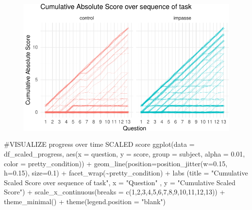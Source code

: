 \documentclass[
  letterpaper,
  DIV=11,
  numbers=noendperiod]{scrreprt}
\newenvironment{Shaded}{\begin{snugshade}}{\end{snugshade}}
\newcommand{\AttributeTok}[1]{\textcolor[rgb]{0.40,0.45,0.13}{#1}}
\newcommand{\CommentTok}[1]{\textcolor[rgb]{0.37,0.37,0.37}{#1}}
\newcommand{\DecValTok}[1]{\textcolor[rgb]{0.68,0.00,0.00}{#1}}
\newcommand{\FloatTok}[1]{\textcolor[rgb]{0.68,0.00,0.00}{#1}}
\newcommand{\FunctionTok}[1]{\textcolor[rgb]{0.28,0.35,0.67}{#1}}
\newcommand{\NormalTok}[1]{\textcolor[rgb]{0.00,0.23,0.31}{#1}}
\newcommand{\SpecialCharTok}[1]{\textcolor[rgb]{0.37,0.37,0.37}{#1}}
\newcommand{\StringTok}[1]{\textcolor[rgb]{0.13,0.47,0.30}{#1}}
\begin{document}
\begin{figure}[H]

{\centering \includegraphics{analysis/SGC3A/2_sgc3A_scoring_files/figure-pdf/VIZ-PROGRESS-1.pdf}

}

\end{figure}

\begin{Shaded}
\begin{Highlighting}[]
\CommentTok{\#VISUALIZE progress over time SCALED score }
\FunctionTok{ggplot}\NormalTok{(}\AttributeTok{data =}\NormalTok{ df\_scaled\_progress, }\FunctionTok{aes}\NormalTok{(}\AttributeTok{x =}\NormalTok{ question, }\AttributeTok{y =}\NormalTok{ score, }\AttributeTok{group =}\NormalTok{ subject, }\AttributeTok{alpha =} \FloatTok{0.01}\NormalTok{, }\AttributeTok{color =}\NormalTok{ pretty\_condition)) }\SpecialCharTok{+} 
 \FunctionTok{geom\_line}\NormalTok{(}\AttributeTok{position=}\FunctionTok{position\_jitter}\NormalTok{(}\AttributeTok{w=}\FloatTok{0.15}\NormalTok{, }\AttributeTok{h=}\FloatTok{0.15}\NormalTok{), }\AttributeTok{size=}\FloatTok{0.1}\NormalTok{) }\SpecialCharTok{+}
 \FunctionTok{facet\_wrap}\NormalTok{(}\SpecialCharTok{\textasciitilde{}}\NormalTok{pretty\_condition) }\SpecialCharTok{+} 
 \FunctionTok{labs}\NormalTok{ (}\AttributeTok{title =} \StringTok{"Cumulative Scaled Score over sequence of task"}\NormalTok{, }\AttributeTok{x =} \StringTok{"Question"}\NormalTok{ , }\AttributeTok{y =} \StringTok{"Cumulative Scaled Score"}\NormalTok{) }\SpecialCharTok{+} 
 \FunctionTok{scale\_x\_continuous}\NormalTok{(}\AttributeTok{breaks =} \FunctionTok{c}\NormalTok{(}\DecValTok{1}\NormalTok{,}\DecValTok{2}\NormalTok{,}\DecValTok{3}\NormalTok{,}\DecValTok{4}\NormalTok{,}\DecValTok{5}\NormalTok{,}\DecValTok{6}\NormalTok{,}\DecValTok{7}\NormalTok{,}\DecValTok{8}\NormalTok{,}\DecValTok{9}\NormalTok{,}\DecValTok{10}\NormalTok{,}\DecValTok{11}\NormalTok{,}\DecValTok{12}\NormalTok{,}\DecValTok{13}\NormalTok{)) }\SpecialCharTok{+}
 \FunctionTok{theme\_minimal}\NormalTok{() }\SpecialCharTok{+} \FunctionTok{theme}\NormalTok{(}\AttributeTok{legend.position =} \StringTok{"blank"}\NormalTok{)}
\end{Highlighting}
\end{Shaded}
\end{document}
